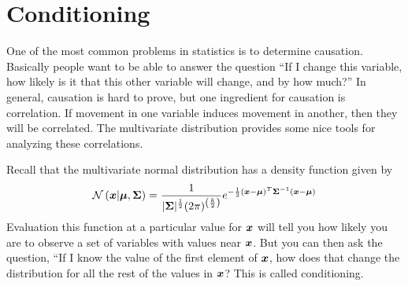 \documentclass[../../main.tex]{subfiles}
\begin{document}
 
\section{Conditioning}
One of the most common problems in statistics is to determine causation.
Basically people want to be able to answer the question ``If I change this
variable, how likely is it that this other variable will change, and by how
much?''  In general, causation is hard to prove, but one ingredient for
causation is correlation.  If movement in one variable induces movement in
another, then they will be correlated.  The multivariate distribution provides
some nice tools for analyzing these correlations.

Recall that the multivariate normal distribution has a density function given
by
\begin{equation}
    \mathcal{N}\left(\boldsymbol{x}| \boldsymbol{\mu}, \boldsymbol{\Sigma} \right)
    = \frac{1}{
            |\boldsymbol{\Sigma}|^\frac{1}{2} (2\pi)^{\left(\frac{k}{2}\right)}
        }
        e^{
            -\frac{1}{2}
            (\boldsymbol{x} - \boldsymbol{\mu})^T
            \boldsymbol{\Sigma}^{-1}
            (\boldsymbol{x} - \boldsymbol{\mu})
    }
\end{equation}
Evaluation this function at a particular value for $\boldsymbol{x}$ will tell you how
likely you are to observe a set of variables with values near $\boldsymbol{x}$. But you
can then ask the question, ``If I know the value of the first element of
$\boldsymbol{x}$, how does that change the distribution for all the rest of the values
in $\boldsymbol{x}$?  This is called conditioning.
\end{document}
